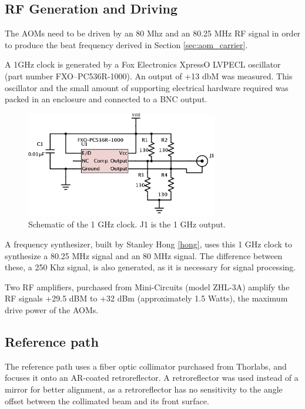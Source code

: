\subsection{RF Generation and Driving}

The AOMs need to be driven by an 80 Mhz and an 80.25 MHz RF signal in order to produce the beat frequency derived in Section \ref{sec:aom_carrier}.

A 1GHz clock is generated by a Fox Electronics XpressO LVPECL oscillator (part number FXO–PC536R-1000). An output of +13 dbM was measured. This oscillator and the small amount of supporting electrical hardware required was packed in an enclosure and connected to a BNC output.

\begin{figure}[h!]
\centering
\includegraphics[width=0.75\textwidth]{Images/Schematics/1ghzclock_2.png}
\caption{Schematic of the 1 GHz clock. J1 is the 1 GHz output.}
\end{figure}

A frequency synthesizer, built by Stanley Hong \ref{hong}, uses this 1 GHz clock to synthesize a 80.25 MHz signal and an 80 MHz signal. The difference between these, a 250 Khz signal, is also generated, as it is necessary for signal processing.

Two RF amplifiers, purchased from Mini-Circuits (model ZHL-3A) amplify the RF signals +29.5 dBM to +32 dBm (approximately 1.5 Watts), the maximum drive power of the AOMs.

\subsection{Reference path}


The reference path uses a fiber optic collimator purchased from Thorlabs, and focuses it onto an AR-coated retroreflector. A retroreflector was used instead of a mirror for better alignment, as a retroreflector has no sensitivity to the angle offset between the collimated beam and its front surface.

